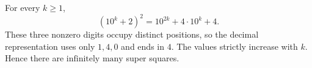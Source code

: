 For every $k\ge1$,
\[
(10^k+2)^2=10^{2k}+4\cdot10^k+4.
\]
These three nonzero digits occupy distinct positions, so the decimal representation uses only $1,4,0$ and ends in $4$. The values strictly increase with $k$. Hence there are $\boxed{\text{infinitely many}}$ super squares.
